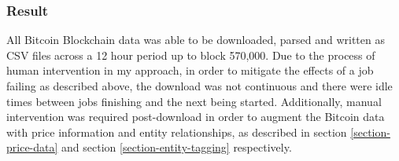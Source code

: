 \subsubsection{Result}
All Bitcoin Blockchain data was able to be downloaded, parsed and written as CSV files across a 12 hour period up to block 570,000. Due to the process of human intervention in my approach, in order to mitigate the effects of a job failing as described above, the download was not continuous and there were idle times between jobs finishing and the next being started. Additionally, manual intervention was required post-download in order to augment the Bitcoin data with price information and entity relationships, as described in section \ref{section-price-data} and section \ref{section-entity-tagging} respectively. 